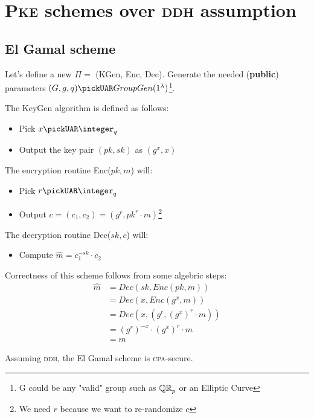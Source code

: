 \section{\textsc{Pke} schemes over \textsc{ddh} assumption}
\subsection{El Gamal scheme}
Let's define a new $\Pi=$ (KGen, Enc, Dec). Generate the needed (\textbf{public}) parameters $(G,g,q)\pickUAR GroupGen(1^{\lambda})$\footnote{G could be any "valid" group such as $\QR[p]$ or an Elliptic Curve}.

The KeyGen algorithm is defined as follows:
\begin{itemize}
    \item Pick $x \pickUAR \integer_q$
    \item Output the key pair $(pk, sk)$ as $(g^x, x)$
\end{itemize}
The encryption routine Enc($pk, m$) will:
\begin{itemize}
    \item Pick $r\pickUAR \integer_q$
    \item Output $c=(c_1, c_2)=(g^r, pk^r \cdot m)$\footnote{We need $r$ because we want to re-randomize $c$}
\end{itemize}
The decryption routine Dec($sk, c$) will:
\begin{itemize}
    \item Compute $\hat{m} = c_1^{-sk} \cdot c_2$
\end{itemize}
Correctness of this scheme follows from some algebric steps:
\begin{align*}
    \hat{m} &= Dec(sk, Enc(pk, m)) \\
    &= Dec(x, Enc(g^x, m)) \\
    &= Dec(x, (g^r, (g^x)^r \cdot m)) \\
    &= (g^r)^{-x} \cdot (g^x)^r \cdot m \\
    &= m
\end{align*}

\begin{theorem}
    Assuming \textsc{ddh}, the El Gamal scheme is \textsc{cpa}-secure.
\end{theorem}

